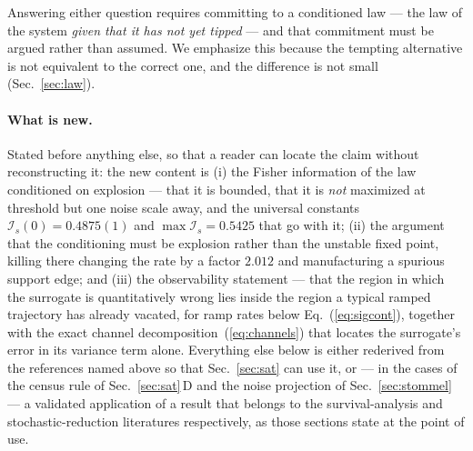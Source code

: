 \documentclass[%
 aip,
 cha,
 amsmath,amssymb,
 reprint,
 superscriptaddress,
 floatfix,
]{revtex4-2}
\newcommand{\Ifish}{\mathcal{I}}
\begin{document}
Answering either question requires committing to a conditioned law --- the law of the system \emph{given that it has not yet tipped} --- and that commitment must be argued rather than assumed.  We emphasize this because the tempting alternative is not equivalent to the correct one, and the difference is not small (Sec.~\ref{sec:law}).

\paragraph{What is new.}
Stated before anything else, so that a reader can locate the claim without reconstructing it: the new content is (i) the Fisher information of the law conditioned on explosion --- that it is bounded, that it is \emph{not} maximized at threshold but one noise scale away, and the universal constants $\Ifish_s(0)=0.4875(1)$ and $\max\Ifish_s=0.5425$ that go with it; (ii) the argument that the conditioning must be explosion rather than the unstable fixed point, killing there changing the rate by a factor $2.012$ and manufacturing a spurious support edge; and (iii) the observability statement --- that the region in which the surrogate is quantitatively wrong lies inside the region a typical ramped trajectory has already vacated, for ramp rates below Eq.~(\ref{eq:sigcont}), together with the exact channel decomposition~(\ref{eq:channels}) that locates the surrogate's error in its variance term alone.  Everything else below is either rederived from the references named above so that Sec.~\ref{sec:sat} can use it, or --- in the cases of the census rule of Sec.~\ref{sec:sat}\,D and the noise projection of Sec.~\ref{sec:stommel} --- a validated application of a result that belongs to the survival-analysis and stochastic-reduction literatures respectively, as those sections state at the point of use.
\end{document}

